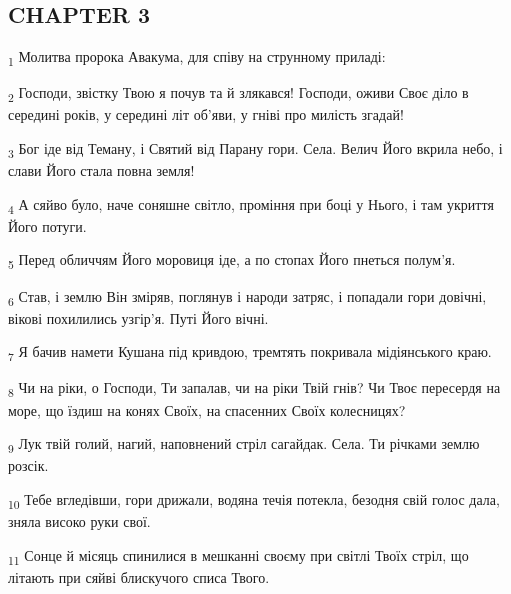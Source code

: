 \subsection{CHAPTER 3}
\begin{tcolorbox}
\textsubscript{1} Молитва пророка Авакума, для співу на струнному приладі:
\end{tcolorbox}
\begin{tcolorbox}
\textsubscript{2} Господи, звістку Твою я почув та й злякався! Господи, оживи Своє діло в середині років, у середині літ об'яви, у гніві про милість згадай!
\end{tcolorbox}
\begin{tcolorbox}
\textsubscript{3} Бог іде від Теману, і Святий від Парану гори. Села. Велич Його вкрила небо, і слави Його стала повна земля!
\end{tcolorbox}
\begin{tcolorbox}
\textsubscript{4} А сяйво було, наче соняшне світло, проміння при боці у Нього, і там укриття Його потуги.
\end{tcolorbox}
\begin{tcolorbox}
\textsubscript{5} Перед обличчям Його моровиця іде, а по стопах Його пнеться полум'я.
\end{tcolorbox}
\begin{tcolorbox}
\textsubscript{6} Став, і землю Він зміряв, поглянув і народи затряс, і попадали гори довічні, вікові похилились узгір'я. Путі Його вічні.
\end{tcolorbox}
\begin{tcolorbox}
\textsubscript{7} Я бачив намети Кушана під кривдою, тремтять покривала мідіянського краю.
\end{tcolorbox}
\begin{tcolorbox}
\textsubscript{8} Чи на ріки, о Господи, Ти запалав, чи на ріки Твій гнів? Чи Твоє пересердя на море, що їздиш на конях Своїх, на спасенних Своїх колесницях?
\end{tcolorbox}
\begin{tcolorbox}
\textsubscript{9} Лук твій голий, нагий, наповнений стріл сагайдак. Села. Ти річками землю розсік.
\end{tcolorbox}
\begin{tcolorbox}
\textsubscript{10} Тебе вгледівши, гори дрижали, водяна течія потекла, безодня свій голос дала, зняла високо руки свої.
\end{tcolorbox}
\begin{tcolorbox}
\textsubscript{11} Сонце й місяць спинилися в мешканні своєму при світлі Твоїх стріл, що літають при сяйві блискучого списа Твого.
\end{tcolorbox}
